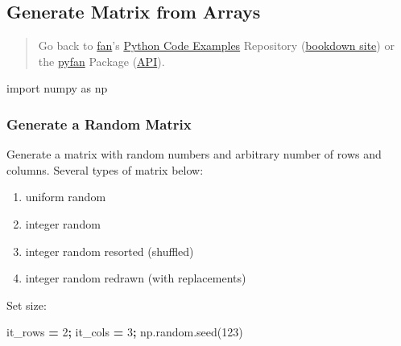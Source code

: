 \documentclass[
]{book}
\newenvironment{Shaded}{\begin{snugshade}}{\end{snugshade}}
\newcommand{\DecValTok}[1]{\textcolor[rgb]{0.00,0.00,0.81}{#1}}
\newcommand{\ImportTok}[1]{#1}
\newcommand{\NormalTok}[1]{#1}
\newcommand{\OperatorTok}[1]{\textcolor[rgb]{0.81,0.36,0.00}{\textbf{#1}}}
\providecommand{\tightlist}{%
  \setlength{\itemsep}{0pt}\setlength{\parskip}{0pt}}
\begin{document}
\hypertarget{generate-matrix-from-arrays}{%
\subsection{Generate Matrix from Arrays}\label{generate-matrix-from-arrays}}

\begin{quote}
Go back to \href{http://fanwangecon.github.io/}{fan}'s \href{https://fanwangecon.github.io/Py4Econ/}{Python Code Examples} Repository (\href{https://fanwangecon.github.io/Py4Econ/bookdown}{bookdown site}) or the \href{https://pyfan.readthedocs.io/en/latest/}{pyfan} Package (\href{https://pyfan.readthedocs.io/en/latest/reference.html}{API}).
\end{quote}

\begin{Shaded}
\begin{Highlighting}[]
\ImportTok{import}\NormalTok{ numpy }\ImportTok{as}\NormalTok{ np}
\end{Highlighting}
\end{Shaded}

\hypertarget{generate-a-random-matrix}{%
\subsubsection{Generate a Random Matrix}\label{generate-a-random-matrix}}

Generate a matrix with random numbers and arbitrary number of rows and columns. Several types of matrix below:

\begin{enumerate}
\def\labelenumi{\arabic{enumi}.}
\tightlist
\item
  uniform random
\item
  integer random
\item
  integer random resorted (shuffled)
\item
  integer random redrawn (with replacements)
\end{enumerate}

Set size:

\begin{Shaded}
\begin{Highlighting}[]
\NormalTok{it\_rows }\OperatorTok{=} \DecValTok{2}\OperatorTok{;}
\NormalTok{it\_cols }\OperatorTok{=} \DecValTok{3}\OperatorTok{;}
\NormalTok{np.random.seed(}\DecValTok{123}\NormalTok{)}
\end{Highlighting}
\end{Shaded}
\end{document}
